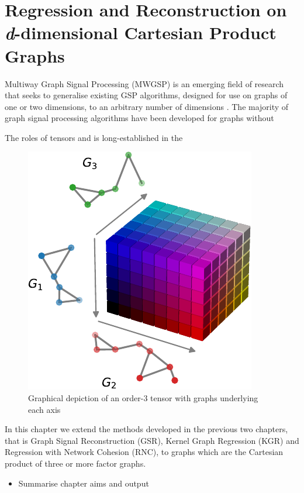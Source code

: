 

\chapter{Regression and Reconstruction on \textit{d}-dimensional Cartesian Product Graphs}


\label{chap:nd_gsp}

Multiway Graph Signal Processing (MWGSP) is an emerging field of research that seeks to generalise existing GSP algorithms, designed for use on graphs of one or two dimensions, to an arbitrary number of dimensions \citep{Stanley2020}. The majority of graph signal processing algorithms have been developed for graphs without 

The roles of tensors and is long-established in the 

\begin{figure}[t]
    \begin{center}
        \includegraphics[width=0.4\linewidth]{Figures/coloured_tensor.pdf}
    \end{center}
    \caption[Graphical depiction of an order-3 tensor]{Graphical depiction of an order-3 tensor with graphs underlying each axis}
    \label{fig:3D_colored_tensor}
\end{figure}


In this chapter we extend the methods developed in the previous two chapters, that is Graph Signal Reconstruction (GSR), Kernel Graph Regression (KGR) and Regression with Network Cohesion (RNC), to graphs which are the Cartesian product of three or more factor graphs. 

\begin{itemize}
    \item Summarise chapter aims and output
\end{itemize}




